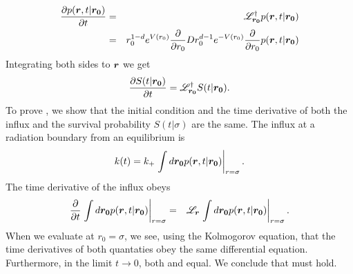 \begin{eqnarray}
 \pdiff{p(\vect{r},t|\vect{r_0})}{t} & = & \mathscr{L}_{\vect{r_0}}^{\dag} p(\vect{r},t|\vect{r_0}) \\
 & = & r_0^{1-d} e^{V(r_0)} \pdiff{}{r_0} D r_0^{d-1} e^{-V(r_0)} \pdiff{}{r_0} p(\vect{r},t|\vect{r_0})
 \elabel{backward_eqn}
\end{eqnarray}
Integrating both sides to $\boldsymbol{r}$ we get
\begin{equation}
 \pdiff{S(t|\vect{r_0})}{t} = \mathscr{L}_{\vect{r_0}}^{\dag} S(t|\vect{r_0}).
 \elabel{S_eqn}
\end{equation}
To prove , we show that the initial condition and the time derivative of both the influx and the survival probability $S(t|\sigma)$ are the same. The influx at a radiation boundary from an equilibrium is
\begin{equation}
 k(t) = k_+ \left. \int d\vect{r_0} p(\vect{r},t|\vect{r_0}) \right|_{r=\sigma}.
 \elabel{bsm_3}
\end{equation}
The time derivative of the influx obeys
\begin{eqnarray}
 \frac{\partial }{\partial t} \left. \int d\boldsymbol{r_0} p(\boldsymbol{r},t|\boldsymbol{r_0}) \right|_{r=\sigma} & = & \mathscr{L}_{\boldsymbol{r}} \left. \int d\boldsymbol{r_0} p(\boldsymbol{r},t|\boldsymbol{r_0}) \right|_{r=\sigma}.
\end{eqnarray}
When we evaluate  at $r_0=\sigma$, we see, using the Kolmogorov equation, that the time derivatives of both quantaties obey the same differential equation. Furthermore, in the limit $t \to 0$, both  and  equal. We conclude that  must hold.


